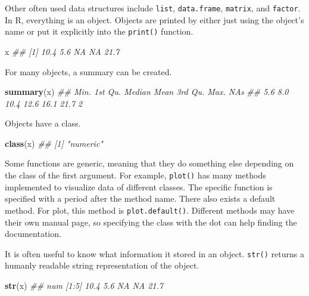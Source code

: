 \documentclass[
  notitlepage]{book}
\newenvironment{Shaded}{\begin{snugshade}}{\end{snugshade}}
\newcommand{\CommentTok}[1]{\textcolor[rgb]{0.56,0.35,0.01}{\textit{#1}}}
\newcommand{\KeywordTok}[1]{\textcolor[rgb]{0.13,0.29,0.53}{\textbf{#1}}}
\newcommand{\NormalTok}[1]{#1}
\begin{document}
Other often used data structures include \texttt{list}, \texttt{data.frame}, \texttt{matrix},
and \texttt{factor}. In R, everything is an object. Objects are printed by
either just using the object's name or put it explicitly into the
\texttt{print()} function.

\begin{Shaded}
\begin{Highlighting}[]
\NormalTok{x}
\CommentTok{\#\# [1] 10.4  5.6   NA   NA 21.7}
\end{Highlighting}
\end{Shaded}

For many objects, a summary can be created.

\begin{Shaded}
\begin{Highlighting}[]
\KeywordTok{summary}\NormalTok{(x)}
\CommentTok{\#\#    Min. 1st Qu.  Median    Mean 3rd Qu.    Max.    NA\textquotesingle{}s }
\CommentTok{\#\#     5.6     8.0    10.4    12.6    16.1    21.7       2}
\end{Highlighting}
\end{Shaded}

Objects have a class.

\begin{Shaded}
\begin{Highlighting}[]
\KeywordTok{class}\NormalTok{(x)}
\CommentTok{\#\# [1] "numeric"}
\end{Highlighting}
\end{Shaded}

Some functions are generic, meaning that they do something else
depending on the class of the first argument. For example, \texttt{plot()} has
many methods implemented to visualize data of different classes. The
specific function is specified with a period after the method name.
There also exists a default method. For plot, this method is
\texttt{plot.default()}. Different methods may have their own manual page, so
specifying the class with the dot can help finding the documentation.

It is often useful to know what information it stored in an object.
\texttt{str()} returns a humanly readable string representation of the object.

\begin{Shaded}
\begin{Highlighting}[]
\KeywordTok{str}\NormalTok{(x)}
\CommentTok{\#\#  num [1:5] 10.4 5.6 NA NA 21.7}
\end{Highlighting}
\end{Shaded}
\end{document}

